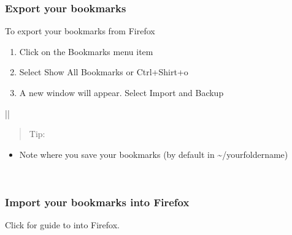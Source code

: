 \documentclass[letterpaper,10pt,english]{sphinxmanual}
\begin{document}
\subsubsection{Export your bookmarks}
\label{\detokenize{docs/software:export-your-bookmarks}}
To export your bookmarks from Firefox
\begin{enumerate}
\def\theenumi{\arabic{enumi}}
\def\labelenumi{\theenumi .}
\makeatletter\def\p@enumii{\p@enumi \theenumi .}\makeatother
\item {} 
Click on the Bookmarks menu item

\item {} 
Select Show All Bookmarks or Ctrl+Shirt+o

\item {} 
A new window will appear. Select Import and Backup

\end{enumerate}


\begin{savenotes}\sphinxattablestart
\centering
\begin{tabular}[t]{|*{1}{|}}
\hline
\begin{quote}

Tip:
\end{quote}
\begin{itemize}
\item {} 
Note where you save your bookmarks (by default in \textasciitilde{}/yourfoldername)

\end{itemize}
\\
\hline
\end{tabular}
\par
\sphinxattableend\end{savenotes}


\subsubsection{Import your bookmarks into Firefox}
\label{\detokenize{docs/software:import-your-bookmarks-into-firefox}}
Click for guide to  into Firefox.
\end{document}
